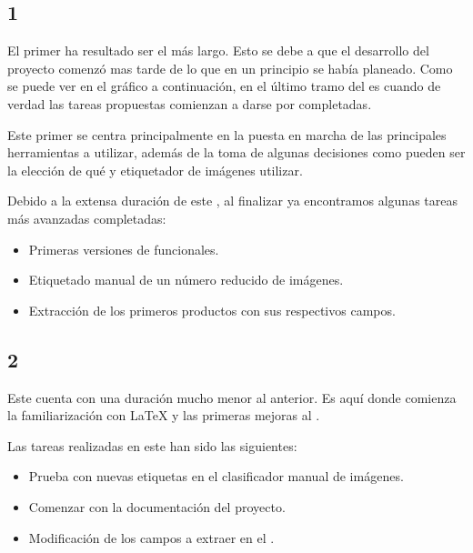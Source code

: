 \subsection{ 1} %
El primer  ha resultado ser el más largo. Esto se debe a que el desarrollo del proyecto comenzó mas tarde de lo que en un principio se había planeado. Como se puede ver en el gráfico  a continuación, en el último tramo del  es cuando de verdad las tareas propuestas comienzan a darse por completadas.


Este primer  se centra principalmente en la puesta en marcha de las principales herramientas a utilizar, además de la toma de algunas decisiones como pueden ser la elección de qué  y etiquetador de imágenes utilizar.

Debido a la extensa duración de este , al finalizar ya encontramos algunas tareas más avanzadas completadas:

\begin{itemize}
    \item Primeras versiones de  funcionales.
    \item Etiquetado manual de un número reducido de imágenes.
    \item Extracción de los primeros productos con sus respectivos campos.
\end{itemize}


\subsection{ 2} %
 Este  cuenta con una duración mucho menor al anterior. Es aquí donde comienza la familiarización con \LaTeX{} y las primeras mejoras al .
 
 
Las tareas realizadas en este  han sido las siguientes:
 
\begin{itemize}
    \item Prueba con nuevas etiquetas en el clasificador manual de imágenes.
    \item Comenzar con la documentación del proyecto.
    \item Modificación de los campos a extraer en el .
\end{itemize}


